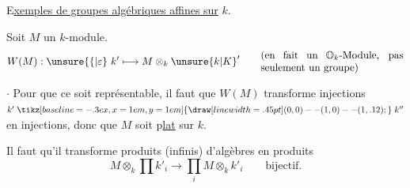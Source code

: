 E\uline{xemples de groupes algébriques affines sur} $k$.


Soit $M$ un $k$-module.
\[
 W(M):\unsure{\{|\varepsilon}\ k'\longmapsto M\otimes_k \unsure{k|K}'
 \qquad\text{\parbox{.4\linewidth}{(en fait un $\mathbb{O}_k$-Module, pas seulement un groupe)}}
\]

$\cdot$ Pour que ce soit représentable, il faut que $W(M)$ transforme injections $k'\mathrel{\tikz[baseline=-.3ex,x=1em,y=1em]{\draw[line width=.45pt] (0,0)--(1,0)--(1,.12);}} k''$ en injections, donc que $M$ soit p\uline{lat} sur $k$. 

Il faut qu'il transforme produits (infinis) d'algèbres en produits
\[
 M\otimes_k\prod k'_i\longrightarrow\prod_i M\otimes_k k'_i
 \qquad\text{bijectif.}
\]

